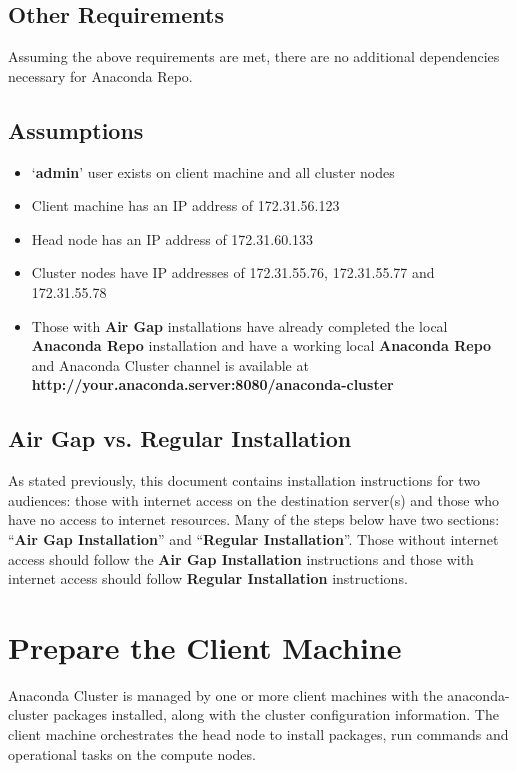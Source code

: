 \documentclass[letterpaper,10pt,openany,oneside]{sphinxmanual}
\begin{document}
\subsection{Other Requirements}
\label{AnacondaCluster:other-requirements}
Assuming the above requirements are met, there are no additional
dependencies necessary for Anaconda Repo.


\subsection{Assumptions}
\label{AnacondaCluster:assumptions}\begin{itemize}
\item {} 
‘\textbf{admin}’ user exists on client machine and all cluster nodes

\item {} 
Client machine has an IP address of 172.31.56.123

\item {} 
Head node has an IP address of 172.31.60.133

\item {} 
Cluster nodes have IP addresses of 172.31.55.76, 172.31.55.77 and
172.31.55.78

\item {} 
Those with \textbf{Air Gap} installations have already completed the local
\textbf{Anaconda Repo} installation and have a working local \textbf{Anaconda
Repo} and Anaconda Cluster channel is available at
\textbf{http://your.anaconda.server:8080/anaconda-cluster}

\end{itemize}


\subsection{Air Gap vs. Regular Installation}
\label{AnacondaCluster:air-gap-vs-regular-installation}
As stated previously, this document contains installation instructions
for two audiences: those with internet access on the destination
server(s) and those who have no access to internet resources. Many of
the steps below have two sections: ``\textbf{Air Gap Installation}'' and
``\textbf{Regular Installation}''. Those without internet access should follow
the \textbf{Air Gap Installation} instructions and those with internet access
should follow \textbf{Regular Installation} instructions.


\section{Prepare the Client Machine}
\label{AnacondaCluster:prepare-the-client-machine}
Anaconda Cluster is managed by one or more client machines with the
anaconda-cluster packages installed, along with the cluster
configuration information. The client machine orchestrates the head node
to install packages, run commands and operational tasks on the compute
nodes.
\end{document}
